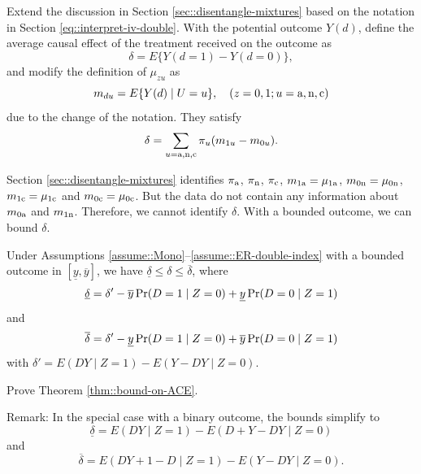 \begin{HomeworkProblem}\label{exr:22-9}


Extend the discussion in Section \ref{sec::disentangle-mixtures} based on the notation in Section \ref{eq::interpret-iv-double}. With the potential outcome $Y(d)$, define the average causal effect of the treatment received on the outcome as
\[
\delta = E\{  Y(d=1) - Y(d=0) \},
\]
and modify the definition of $\mu_{zu} $ as
\[
m_{du} = E\{  Y(d) \mid U = u\},\quad  (z=0,1;u=\textup{a}, \textup{n}, \textup{c})
\]
due to the change of the notation.
They satisfy
\[
\delta = \sum_{u = \textup{a}, \textup{n}, \textup{c}}  \pi_u  (m_{1u} - m_{0u}).
\]

Section \ref{sec::disentangle-mixtures} identifies $\pi_{\textup{a}}$, $\pi_{\textup{n}}$, $\pi_{\textup{c}}$, $m_{1\textup{a}} = \mu_{1 \textup{a}}$, $m_{0\textup{n}} = \mu_{0\textup{n} }$, $m_{1\textup{c}} = \mu_{1\textup{c}}$ and $m_{0\textup{c}} = \mu_{0\textup{c}}$. But the data do not contain any information about $m_{0 \textup{a}}$ and $m_{1\textup{n} }$. Therefore, we cannot identify $\delta$. With a bounded outcome, we can bound $\delta$.

\begin{Theorem}
\label{thm::bound-on-ACE}
Under Assumptions \ref{assume::Mono}--\ref{assume::ER-double-index} with a bounded outcome in $[\underline{y}, \overline{y}]$, we have $\underline{\delta} \leq  \delta  \leq \overline{\delta}$, where
\[
\underline{\delta} =  \delta'  - \overline{y} \operatorname{Pr}(D=1\mid Z=0) + \underline{y} \operatorname{Pr}(D=0\mid Z=1)
\]
and
\[
\overline{\delta} = \delta'  -   \underline{y} \operatorname{Pr}(D=1\mid Z=0) +  \overline{y}  \operatorname{Pr}(D=0\mid Z=1)
\]
with $\delta' = E(DY\mid Z=1) - E(Y-DY\mid Z=0) .$
\end{Theorem}

Prove Theorem  \ref{thm::bound-on-ACE}.


Remark: In the special case with a binary outcome, the bounds simplify to
 \[
\underline{\delta} =   E(DY\mid Z=1) - E( D+Y-DY\mid Z=0)
\]
and
\[
\overline{\delta} =  E(DY+1-D\mid Z=1) - E(Y-DY\mid Z=0) .
 \]


\end{HomeworkProblem}

